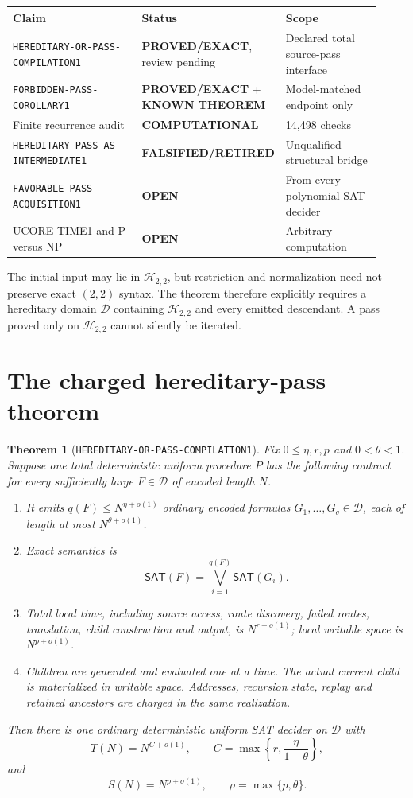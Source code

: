\documentclass[11pt]{article}
\newtheorem{theorem}{Theorem}
\newcommand{\SAT}{\mathsf{SAT}}
\newcommand{\Htwo}{\mathcal H_{2,2}}
\newcommand{\EXACT}{\textbf{PROVED/EXACT}}
\newcommand{\KNOWN}{\textbf{KNOWN THEOREM}}
\newcommand{\OPEN}{\textbf{OPEN}}
\newcommand{\RETIRED}{\textbf{FALSIFIED/RETIRED}}
\newcommand{\COMP}{\textbf{COMPUTATIONAL}}
\begin{document}
\begin{center}\small
\begin{tabular}{@{}p{0.43\linewidth}p{0.19\linewidth}p{0.30\linewidth}@{}}
\toprule
Claim & Status & Scope\\ \midrule
\texttt{HEREDITARY-OR-PASS-COMPILATION1} & \EXACT, review pending & Declared total source-pass interface\\
\texttt{FORBIDDEN-PASS-COROLLARY1} & \EXACT{} + \KNOWN & Model-matched endpoint only\\
Finite recurrence audit & \COMP & 14,498 checks\\
\texttt{HEREDITARY-PASS-AS-INTERMEDIATE1} & \RETIRED & Unqualified structural bridge\\
\texttt{FAVORABLE-PASS-ACQUISITION1} & \OPEN & From every polynomial SAT decider\\
UCORE-TIME1 and P versus NP & \OPEN & Arbitrary computation\\
\bottomrule
\end{tabular}
\end{center}

The initial input may lie in $\Htwo$, but restriction and normalization need
not preserve exact $(2,2)$ syntax.  The theorem therefore explicitly requires
a hereditary domain $\mathcal D$ containing $\Htwo$ and every emitted
descendant.  A pass proved only on $\Htwo$ cannot silently be iterated.

\section{The charged hereditary-pass theorem}

\begin{theorem}[\texttt{HEREDITARY-OR-PASS-COMPILATION1}]
Fix $0\le\eta,r,p$ and $0<\theta<1$.  Suppose one total deterministic
uniform procedure $P$ has the following contract for every sufficiently large
$F\in\mathcal D$ of encoded length $N$.
\begin{enumerate}[leftmargin=*]
\item It emits $q(F)\le N^{\eta+o(1)}$ ordinary encoded formulas
$G_1,\ldots,G_q\in\mathcal D$, each of length at most
$N^{\theta+o(1)}$.
\item Exact semantics is
\[
 \SAT(F)=\bigvee_{i=1}^{q(F)}\SAT(G_i).                 \tag{2}
\]
\item Total local time, including source access, route discovery, failed
routes, translation, child construction and output, is $N^{r+o(1)}$; local
writable space is $N^{p+o(1)}$.
\item Children are generated and evaluated one at a time.  The actual current
child is materialized in writable space.  Addresses, recursion state, replay
and retained ancestors are charged in the same realization.
\end{enumerate}
Then there is one ordinary deterministic uniform SAT decider on $\mathcal D$
with
\[
 T(N)=N^{C+o(1)},\qquad
 C=\max\left\{r,\frac{\eta}{1-\theta}\right\},          \tag{3}
\]
and
\[
 S(N)=N^{\rho+o(1)},\qquad \rho=\max\{p,\theta\}.       \tag{4}
\]
\end{theorem}
\end{document}
